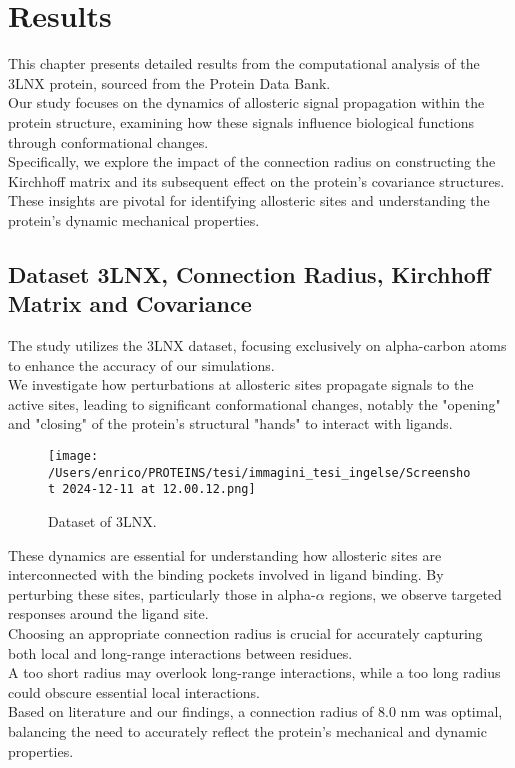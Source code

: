 \documentclass[English, Lau, oneside]{sapthesis}
\begin{document}
\chapter{Results}
\noindent 
This chapter presents detailed results from the computational analysis of the 3LNX protein, sourced from the Protein Data Bank.
\\
Our study focuses on the dynamics of allosteric signal propagation within the protein structure, examining how these signals influence biological functions through conformational changes. \\
Specifically, we explore the impact of the connection radius on constructing the Kirchhoff matrix and its subsequent effect on the protein’s covariance structures. These insights are pivotal for identifying allosteric sites and understanding the protein's dynamic mechanical properties.

\section{Dataset 3LNX, Connection Radius, Kirchhoff Matrix and Covariance}\label{Kirchhoff_paragraph}
\noindent The study utilizes the 3LNX dataset, focusing exclusively on alpha-carbon atoms to enhance the accuracy of our simulations. \\
We investigate how perturbations at allosteric sites propagate signals to the active sites, leading to significant conformational changes, notably the "opening" and "closing" of the protein’s structural "hands" to interact with ligands.
\begin{figure}[h!]
    \centering
    \texttt{[image: /Users/enrico/PROTEINS/tesi/immagini\_tesi\_ingelse/Screenshot 2024-12-11 at 12.00.12.png]}
    \caption{Dataset of 3LNX.}
\end{figure}

These dynamics are essential for understanding how allosteric sites are interconnected with the binding pockets involved in ligand binding. By perturbing these sites, particularly those in alpha-$\alpha$ regions, we observe targeted responses around the ligand site.\\
Choosing an appropriate connection radius is crucial for accurately capturing both local and long-range interactions between residues.\\
A too short radius may overlook long-range interactions, while a too long radius could obscure essential local interactions.\\
Based on literature and our findings, a connection radius of 8.0 nm was optimal, balancing the need to accurately reflect the protein’s mechanical and dynamic properties.
\end{document}
